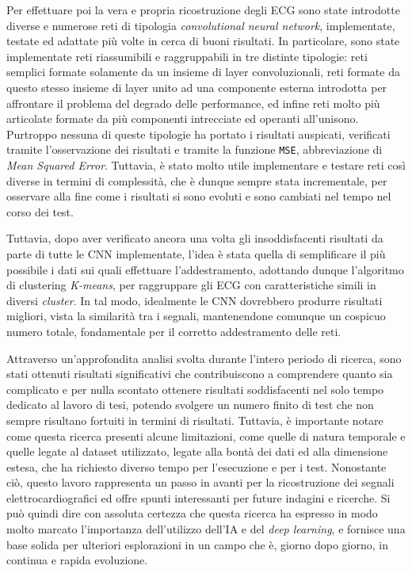 Per effettuare poi la vera e propria ricostruzione degli ECG sono state introdotte diverse e numerose reti di tipologia \textit{convolutional neural network}, implementate, testate ed adattate più volte in cerca di buoni risultati. In particolare, sono state implementate reti riassumibili e raggruppabili in tre distinte tipologie: reti semplici formate solamente da un insieme di layer convoluzionali, reti formate da questo stesso insieme di layer unito ad una componente esterna introdotta per affrontare il problema del degrado delle performance, ed infine reti molto più articolate formate da più componenti intrecciate ed operanti all'unisono. Purtroppo nessuna di queste tipologie ha portato i risultati auspicati, verificati tramite l'osservazione dei risultati e tramite la funzione \texttt{MSE}, abbreviazione di \textit{Mean Squared Error}. Tuttavia, è stato molto utile implementare e testare reti così diverse in termini di complessità, che è dunque sempre stata incrementale, per osservare alla fine come i risultati si sono evoluti e sono cambiati nel tempo nel corso dei test.

Tuttavia, dopo aver verificato ancora una volta gli insoddisfacenti risultati da parte di tutte le CNN implementate, l'idea è stata quella di semplificare il più possibile i dati sui quali effettuare l'addestramento, adottando dunque l'algoritmo di clustering \textit{K-means}, per raggruppare gli ECG con caratteristiche simili in diversi \textit{cluster}. In tal modo, idealmente le CNN dovrebbero produrre risultati migliori, vista la similarità tra i segnali, mantenendone comunque un cospicuo numero totale, fondamentale per il corretto addestramento delle reti.

Attraverso un'approfondita analisi svolta durante l'intero periodo di ricerca, sono stati ottenuti risultati significativi che contribuiscono a comprendere quanto sia complicato e per nulla scontato ottenere risultati soddisfacenti nel solo tempo dedicato al lavoro di tesi, potendo svolgere un numero finito di test che non sempre risultano fortuiti in termini di risultati. Tuttavia, è importante notare come questa ricerca presenti alcune limitazioni, come quelle di natura temporale e quelle legate al dataset utilizzato, legate alla bontà dei dati ed alla dimensione estesa, che ha richiesto diverso tempo per l'esecuzione e per i test. Nonostante ciò, questo lavoro rappresenta un passo in avanti per la ricostruzione dei segnali elettrocardiografici ed offre spunti interessanti per future indagini e ricerche. Si può quindi dire con assoluta certezza che questa ricerca ha espresso in modo molto marcato l'importanza dell'utilizzo dell'IA e del \textit{deep learning}, e fornisce una base solida per ulteriori esplorazioni in un campo che è, giorno dopo giorno, in continua e rapida evoluzione.

\afterpage{\blankpage}




\afterpage{\blankpage}


